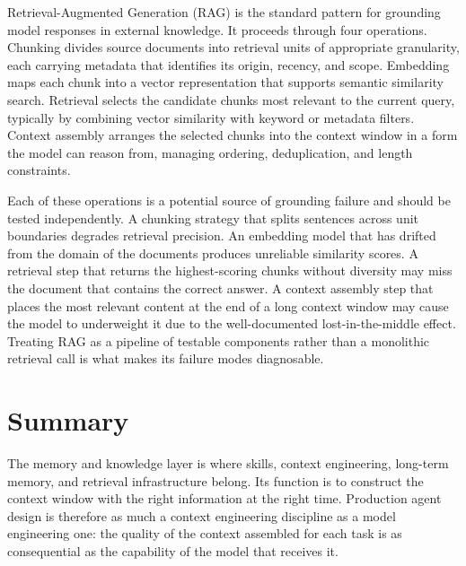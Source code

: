 Retrieval-Augmented Generation (RAG) is the standard pattern for grounding model
responses in external knowledge. It proceeds through four operations. Chunking divides
source documents into retrieval units of appropriate granularity, each carrying metadata
that identifies its origin, recency, and scope. Embedding maps each chunk into a vector
representation that supports semantic similarity search. Retrieval selects the candidate
chunks most relevant to the current query, typically by combining vector similarity with
keyword or metadata filters. Context assembly arranges the selected chunks into the
context window in a form the model can reason from, managing ordering, deduplication, and
length constraints.

Each of these operations is a potential source of grounding failure and should be tested
independently. A chunking strategy that splits sentences across unit boundaries degrades
retrieval precision. An embedding model that has drifted from the domain of the documents
produces unreliable similarity scores. A retrieval step that returns the highest-scoring
chunks without diversity may miss the document that contains the correct answer. A context
assembly step that places the most relevant content at the end of a long context window
may cause the model to underweight it due to the well-documented lost-in-the-middle
effect. Treating RAG as a pipeline of testable components rather than a monolithic
retrieval call is what makes its failure modes diagnosable.

\section{Summary}

The memory and knowledge layer is where skills, context engineering, long-term memory,
and retrieval infrastructure belong. Its function is to construct the context window with
the right information at the right time. Production agent design is therefore as much a
context engineering discipline as a model engineering one: the quality of the context
assembled for each task is as consequential as the capability of the model that receives
it.